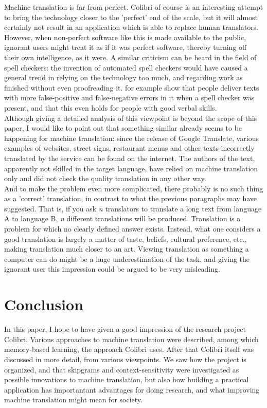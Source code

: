 \documentclass[12pt]{article}
\begin{document}
Machine translation is far from perfect. Colibri of course is an interesting attempt to bring the technology closer to the 'perfect' end of the scale, but it will almost certainly not result in an application which is able to replace human translators. However, when non-perfect software like this is made available to the public, ignorant users might treat it as if it was perfect software, thereby turning off their own intelligence, as it were. A similar criticism can be heard in the field of spell checkers: the invention of automated  spell checkers would have caused a general trend in relying on the technology too much, and regarding work as finished without even proofreading it. \citet{galletta05} for example show that people deliver texts with more false-positive and false-negative errors in it when a spell checker was present, and that this even holds for people with good verbal skills. \\\indent
Although giving a detailed analysis of this viewpoint is beyond the scope of this paper, I would like to point out that something similar already seems to be happening for machine translation: since the release of Google Translate, various examples of websites, street signs, restaurant menus and other texts incorrectly translated by the service can be found on the internet. The authors of the text, apparently not skilled in the target language, have relied on machine translation only and did not check the quality translation in any other way.\\\indent
And to make the problem even more complicated, there probably is no such thing as a 'correct' translation, in contrast to what the previous paragraphs may have suggested. That is, if you ask \emph{n} translators to translate a long text from language A to language B, \emph{n} different translations will be produced. Translation is a problem for which no clearly defined answer exists. Instead, what one considers a good translation is largely a matter of taste, beliefs, cultural preference, etc., making translation much closer to an art. Viewing translation as something a computer can do might be a huge underestimation of the task, and giving the ignorant user this impression could be argued to be very misleading.







\section{Conclusion}
In this paper, I hope to have given a good impression of the research project Colibri. Various approaches to machine translation were described, among which memory-based learning, the approach Colibri uses. After that Colibri itself was discussed in more detail, from various viewpoints. We saw how the project is organized, and that skipgrams and context-sensitivity were investigated as possible innovations to machine translation, but also how building a practical application has importantant advantages for doing research, and what improving machine translation might mean for society.
\end{document}
